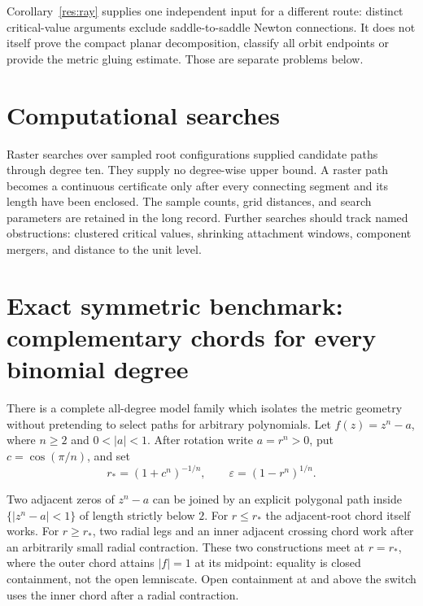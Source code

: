 \documentclass[11pt]{article}
\begin{document}
Corollary~\ref{res:ray} supplies one independent input for a different route:
distinct critical-value arguments exclude saddle-to-saddle Newton
connections.  It does not itself prove the compact planar decomposition,
classify all orbit endpoints or provide the metric gluing estimate.  Those are
separate problems below.

\section{Computational searches}\label{sec:finite}

Raster searches over sampled root configurations supplied candidate paths
through degree ten.  They supply no degree-wise upper bound.  A raster path
becomes a continuous certificate only after every connecting segment and its
length have been enclosed.  The sample counts, grid distances, and search
parameters are retained in the long record.  Further searches should track
named obstructions: clustered critical values, shrinking attachment windows,
component mergers, and distance to the unit level.

\section{Exact symmetric benchmark: complementary chords for every binomial degree}
\label{sec:binomial}


There is a complete all-degree model family which isolates the metric geometry
without pretending to select paths for arbitrary polynomials.  Let
$f(z)=z^n-a$, where $n\ge2$ and $0<|a|<1$.  After rotation write $a=r^n>0$,
put $c=\cos(\pi/n)$, and set
\[
 r_*=(1+c^n)^{-1/n},\qquad
 \varepsilon=(1-r^n)^{1/n}.
\]

\begin{theorem}
Two adjacent zeros of $z^n-a$ can be joined by an explicit polygonal path
inside $\{|z^n-a|<1\}$ of length strictly below $2$.  For $r\le r_*$ the
adjacent-root chord itself works.  For $r\ge r_*$, two radial legs and an
inner adjacent crossing chord work after an arbitrarily small radial
contraction.  These two constructions meet at $r=r_*$, where the outer chord attains
$|f|=1$ at its midpoint: equality is closed containment, not the open
lemniscate.  Open containment at and above the switch uses the inner chord
after a radial contraction.
\end{theorem}
\end{document}
